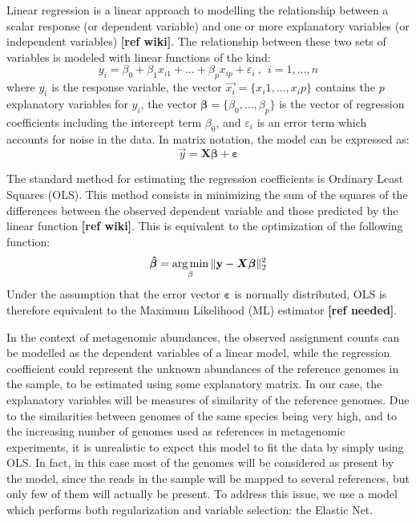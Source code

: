 Linear regression is a linear approach to modelling the relationship between a scalar response (or dependent variable) and one or more explanatory variables (or independent variables) \textbf{[ref wiki]}. The relationship between these two sets of variables is modeled with linear functions of the kind:
\begin{equation*}
    y_i = \beta_0 + \beta_1 x_{i1} + \dots + \beta_p x_{ip} + \varepsilon_i ~,~~ i = 1, \dots , n
\end{equation*}
where $y_i$ is the response variable, the vector $\vec{x_i} = \{x_i1, \dots, x_ip \}$ contains the $p$ explanatory variables for $y_i$, the vector $\boldsymbol{\beta} = \{\beta_0, \dots, \beta_p \}$ is the vector of regression coefficients including the intercept term $\beta_0$, and $\varepsilon_i$ is an error term which accounts for noise in the data. In matrix notation, the model can be expressed as:
\begin{equation*}
    \vec{y} = \boldsymbol{X}\boldsymbol{\beta} + \boldsymbol{\varepsilon}
\end{equation*}

The standard method for estimating the regression coefficients is Ordinary Least Squares (OLS). This method consists in minimizing the sum of the squares of the differences between the observed dependent variable and those predicted by the linear function \textbf{[ref wiki]}. This is equivalent to the optimization of the following function:
\begin{equation*}
    \boldsymbol{\hat{\beta}} = \operatorname*{arg\,min}_{\beta}{\lVert\mathbf{y} - \boldsymbol{X}\boldsymbol{\beta}\rVert_2^2}
\end{equation*}
Under the assumption that the error vector $\boldsymbol{\varepsilon}$ is normally distributed, OLS is therefore equivalent to the Maximum Likelihood (ML) estimator \textbf{[ref needed]}.

In the context of metagenomic abundances, the observed assignment counts can be modelled as the dependent variables of a linear model, while the regression coefficient could represent the unknown abundances of the reference genomes in the sample, to be estimated using some explanatory matrix. In our case, the explanatory variables will be measures of similarity of the reference genomes. Due to the similarities between genomes of the same species being very high, and to the increasing number of genomes used as references in metagenomic experiments, it is unrealistic to expect this model to fit the data by simply using OLS. In fact, in this case most of the genomes will be considered as present by the model, since the reads in the sample will be mapped to several references, but only few of them will actually be present. To address this issue, we use a model which performs both regularization and variable selection: the Elastic Net.

